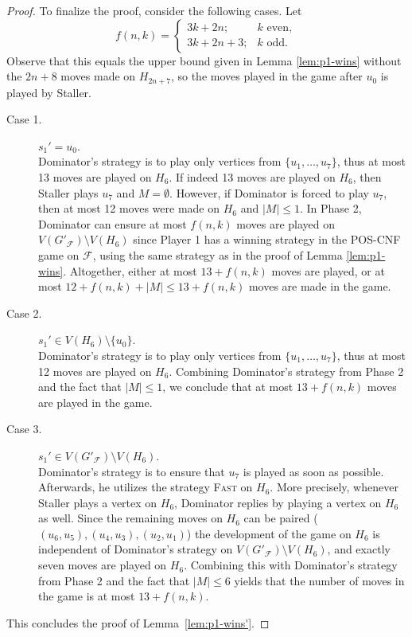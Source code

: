 \documentclass[12pt]{article}
\newcommand{\F}{\mathcal{F}}
\begin{document}
\begin{proof}
	To finalize the proof, consider the following cases. Let $$f(n,k) = \begin{cases}
		3k + 2n; & k \text{ even},\\
		3k + 2n + 3; & k \text{ odd}.
	\end{cases}$$ Observe that this equals the upper bound given in Lemma \ref{lem:p1-wins} without the $2n+8$ moves made on $H_{2n+7}$, so the moves played in the game after $u_0$ is played by Staller. 
	\begin{description}
		\item[Case 1.] $s_1' = u_0$.\\
		Dominator's strategy is to play only vertices from $\{u_1, \ldots, u_7\}$, thus at most 13 moves are played on $H_6$. If indeed 13 moves are played on $H_6$, then Staller plays $u_7$ and $M = \emptyset$. However, if Dominator is forced to play $u_7$, then at most 12 moves were made on $H_6$ and $|M| \leq 1$. In Phase 2, Dominator can ensure at most $f(n,k)$ moves are played on $V(G'_\F) \setminus V(H_6)$ since Player 1 has a winning strategy in the POS-CNF game on $\F$, using the same strategy as in the proof of Lemma \ref{lem:p1-wins}. Altogether, either at most $13 + f(n,k)$ moves are played, or at most $12 + f(n,k) + |M| \leq 13 + f(n,k)$ moves are made in the game.
		
		\item[Case 2.] $s_1' \in V(H_6) \setminus \{u_0\}$.\\
		Dominator's strategy is to play only vertices from $\{u_1, \ldots, u_7\}$, thus at most 12 moves are played on $H_6$. Combining Dominator's strategy from Phase 2 and the fact that $|M| \leq 1$, we conclude that at most $13 + f(n,k)$ moves are played in the game.
		
		\item[Case 3.] $s_1' \in V(G'_\F) \setminus V(H_6)$.\\
		Dominator's strategy is to ensure that $u_7$ is played as soon as possible. Afterwards, he utilizes the strategy \textsc{Fast} on $H_6$. More precisely, whenever Staller plays a vertex on $H_6$, Dominator replies by playing a vertex on $H_6$ as well. Since the remaining moves on $H_6$ can be paired ($(u_6, u_5), (u_4, u_3), (u_2, u_1)$) the development of the game on $H_6$ is independent of Dominator's strategy on $V(G'_\F) \setminus V(H_6)$, and exactly seven moves are played on $H_6$. Combining this with Dominator's strategy from Phase 2 and the fact that $|M| \leq 6$ yields that the number of moves in the game is at most $13 + f(n,k)$.
	\end{description}
	This concludes the proof of Lemma~\ref{lem:p1-wins'}.
\end{proof}
\end{document}
